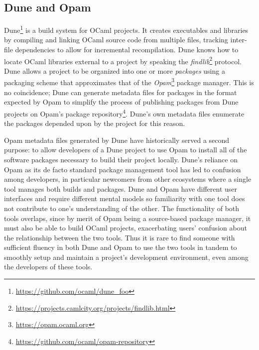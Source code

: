 \documentclass{article}
\begin{document}
    \begin{multicols}{2}

        \section{Dune and Opam}

        Dune\footnote{\url{https://github.com/ocaml/dune_foo}} is a build system for OCaml
        projects. It creates executables and libraries by compiling and linking
        OCaml source code from multiple files, tracking inter-file dependencies
        to allow for incremental recompilation. Dune knows how to locate OCaml
        libraries external to a project by speaking the
        \textit{findlib}\footnote{\url{https://projects.camlcity.org/projects/findlib.html}}
        protocol. Dune allows a project to be organized into one or more
        \textit{packages} using a packaging scheme that approximates that of the
        \textit{Opam}\footnote{\url{https://opam.ocaml.org}} package manager. This is
        no coincidence; Dune can generate metadata files for packages in the
        format expected by Opam to simplify the process of publishing packages
        from Dune projects on Opam's package
        repository\footnote{\url{https://github.com/ocaml/opam-repository}}. Dune's
        own metadata files enumerate the packages depended upon by the project
        for this reason.

        Opam metadata files generated by Dune have historically served a second
        purpose: to allow developers of a Dune project to use Opam to install
        all of the software packages necessary to build their project locally.
        Dune's reliance on Opam as its de facto standard package management tool
        has led to confusion among developers, in particular newcomers from
        other ecosystems where a single tool manages both builds and packages.
        Dune and Opam have different user interfaces and require different
        mental models so familiarity with one tool does not contribute to one's
        understanding of the other. The functionality of both tools overlaps,
        since by merit of Opam being a source-based package manager, it must
        also be able to build OCaml projects, exacerbating users' confusion
        about the relationship between the two tools. Thus it is rare to find
        someone with sufficient fluency in both Dune and Opam to use the two
        tools in tandem to smoothly setup and maintain a project's development
        environment, even among the developers of these tools.


\end{multicols}
\end{document}
